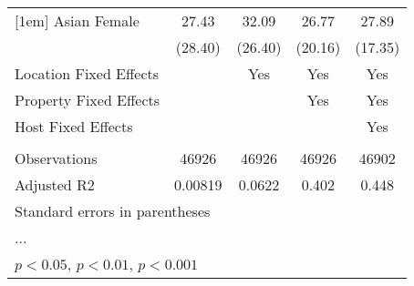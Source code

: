 \begin{table}[htbp]
\begin{tabular}{l*{4}{c}}
[1em]
Asian Female        &       27.43         &       32.09         &       26.77         &       27.89         \\
                    &     (28.40)         &     (26.40)         &     (20.16)         &     (17.35)         \\
\hline
Location Fixed Effects&                     &         Yes         &         Yes         &         Yes         \\
Property Fixed Effects&                     &                     &         Yes         &         Yes         \\
Host Fixed Effects  &                     &                     &                     &         Yes         \\
\hline \vspace{-1.25em}&                     &                     &                     &                     \\
Observations        &       46926         &       46926         &       46926         &       46902         \\
Adjusted R2         &     0.00819         &      0.0622         &       0.402         &       0.448         \\
\hline\hline
\multicolumn{5}{l}{\footnotesize Standard errors in parentheses}\\
\multicolumn{5}{l}{\footnotesize ...}\\
\multicolumn{5}{l}{\footnotesize \sym{*} \(p<0.05\), \sym{**} \(p<0.01\), \sym{***} \(p<0.001\)}\\
\end{tabular}
\end{table}
